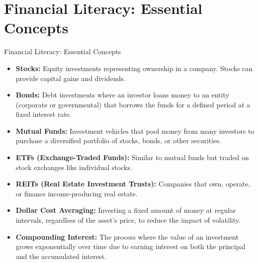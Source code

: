 \documentclass{beamer}
\begin{document}
\section{Financial Literacy: Essential Concepts}
\begin{frame}{Financial Literacy: Essential Concepts}
    \begin{itemize}
        \item \textbf{Stocks:} Equity investments representing ownership in a company. Stocks can provide capital gains and dividends.
        \item \textbf{Bonds:} Debt investments where an investor loans money to an entity (corporate or governmental) that borrows the funds for a defined period at a fixed interest rate.
        \item \textbf{Mutual Funds:} Investment vehicles that pool money from many investors to purchase a diversified portfolio of stocks, bonds, or other securities.
        \item \textbf{ETFs (Exchange-Traded Funds):} Similar to mutual funds but traded on stock exchanges like individual stocks.
        \item \textbf{REITs (Real Estate Investment Trusts):} Companies that own, operate, or finance income-producing real estate.
        \item \textbf{Dollar Cost Averaging:} Investing a fixed amount of money at regular intervals, regardless of the asset's price, to reduce the impact of volatility.
        \item \textbf{Compounding Interest:} The process where the value of an investment grows exponentially over time due to earning interest on both the principal and the accumulated interest.
    \end{itemize}
\end{frame}
\end{document}
